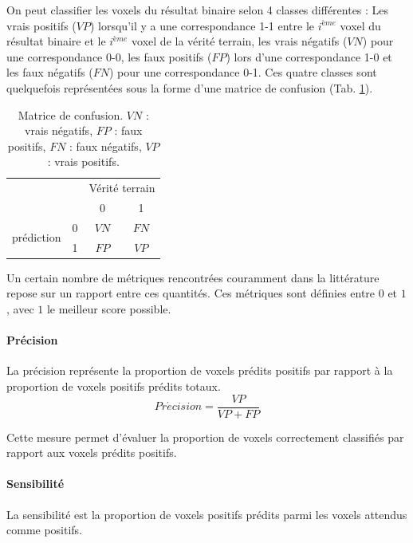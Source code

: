 On peut classifier les voxels du résultat binaire selon 4 classes différentes : Les vrais positifs ($VP$) lorsqu'il y a une correspondance 1-1 entre le $i^{ème}$ voxel du résultat binaire et le $i^{ème}$ voxel de la vérité terrain, les vrais négatifs ($VN$) pour une correspondance 0-0, les faux positifs ($FP$) lors d'une correspondance 1-0 et les faux négatifs ($FN$) pour une correspondance 0-1. Ces quatre classes sont quelquefois représentées sous la forme d'une matrice de confusion (Tab. \ref{tab:confusion_matrix}).

\begin{table}
  \centering
  \begin{tabular}{ cccc }
    \hline
                                      &   &\multicolumn{2}{c}{Vérité terrain} \\
                                      &   & 0  & 1 \\
      \multirow{2}{*}{prédiction}     & 0 & $VN$ & $FN$ \\
                                      & 1 & $FP$ & $VP$  \\
    \hline
  \end{tabular}
  \caption{Matrice de confusion. $VN$ : vrais négatifs, $FP$ : faux positifs, $FN$ : faux négatifs, $VP$ : vrais positifs.}
  \label{tab:confusion_matrix}
\end{table}

Un certain nombre de métriques rencontrées couramment dans la littérature repose sur un rapport entre ces quantités. Ces métriques sont définies entre $0$ et $1$, avec $1$ le meilleur score possible. 

\paragraph{Précision}
La précision représente la proportion de voxels prédits positifs par rapport à la proportion de voxels positifs prédits totaux.
\begin{equation}
  Pr\acute{e}cision = \frac{VP}{VP+FP}
\end{equation}

Cette mesure permet d'évaluer la proportion de voxels correctement classifiés par rapport aux voxels prédits positifs.

\paragraph{Sensibilité}

La sensibilité est la proportion de voxels positifs prédits parmi les voxels attendus comme positifs.

